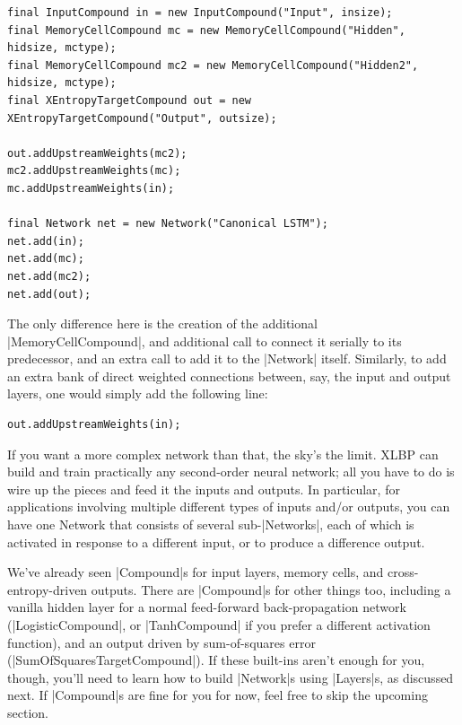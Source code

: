 \documentclass{article}
\begin{document}
\begin{verbatim}
final InputCompound in = new InputCompound("Input", insize);
final MemoryCellCompound mc = new MemoryCellCompound("Hidden", hidsize, mctype);
final MemoryCellCompound mc2 = new MemoryCellCompound("Hidden2", hidsize, mctype);
final XEntropyTargetCompound out = new XEntropyTargetCompound("Output", outsize);

out.addUpstreamWeights(mc2);
mc2.addUpstreamWeights(mc);
mc.addUpstreamWeights(in);

final Network net = new Network("Canonical LSTM");
net.add(in);
net.add(mc);
net.add(mc2);
net.add(out);
\end{verbatim}

The only difference here is the creation of the additional  |MemoryCellCompound|, and additional call
to connect it serially to its predecessor, and an extra call to add it to the |Network| itself. Similarly, to add an extra bank of direct weighted connections between, say, the input and output layers, one would simply add the following line:

\begin{verbatim}
out.addUpstreamWeights(in);
\end{verbatim}

If you want a more complex network than that, the sky's the limit. XLBP can build and train
practically any second-order neural network; all you have to do is wire up the pieces and feed it
the inputs and outputs. In particular, for applications involving multiple different types of inputs
and/or outputs, you can have one Network that consists of several sub-|Networks|, each of which is
activated in response to a different input, or to produce a difference output.

We've already seen |Compound|s for input layers, memory cells, and cross-entropy-driven
outputs. There are |Compound|s for other things too, including a vanilla hidden layer for
a normal feed-forward back-propagation network (|LogisticCompound|, or |TanhCompound| if you prefer a different activation function), and an output driven by sum-of-squares
error (|SumOfSquaresTargetCompound|). If these built-ins aren't enough for you, though,
you'll need to learn how to build |Network|s using |Layers|s, as discussed 
next. If |Compound|s are fine for you for now, feel free to skip the upcoming section.
\end{document}
